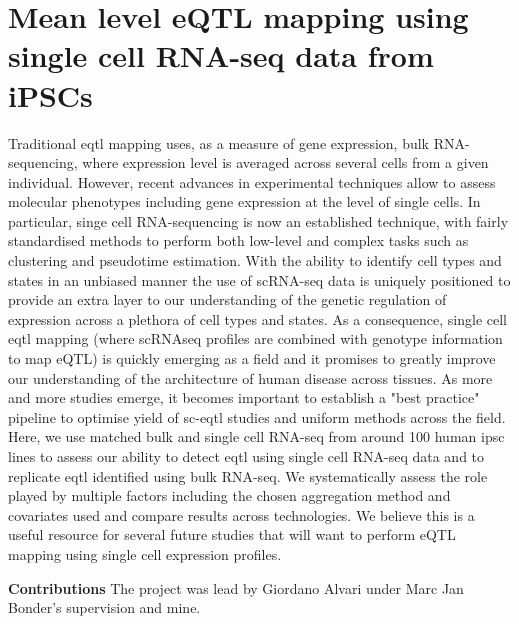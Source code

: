 
\chapter{Mean level eQTL mapping using single cell RNA-seq data from iPSCs}


Traditional \gls{eqtl} mapping uses, as a measure of gene expression, bulk RNA-sequencing, where expression level is averaged across several cells from a given individual.
However, recent advances in experimental techniques allow to assess molecular phenotypes including gene expression at the level of single cells.
In particular, singe cell RNA-sequencing is now an established technique, with fairly standardised methods to perform both low-level and complex tasks such as clustering and pseudotime estimation.
With the ability to identify cell types and states in an unbiased manner the use of scRNA-seq data is uniquely positioned to provide an extra layer to our understanding of the genetic regulation of expression across a plethora of cell types and states.
As a consequence, single cell \gls{eqtl} mapping (where scRNAseq profiles are combined with genotype information to map eQTL) is quickly emerging as a field and it promises to greatly improve our understanding of the architecture of human disease across tissues.
As more and more studies emerge, it becomes important to establish a "best practice" pipeline to optimise yield of sc-\gls{eqtl} studies and uniform methods across the field.
Here, we use matched bulk and single cell RNA-seq from around 100 human \gls{ipsc} lines to assess our ability to detect \gls{eqtl} using single cell RNA-seq data and to replicate \gls{eqtl} identified using bulk RNA-seq.
We systematically assess the role played by multiple factors including the chosen aggregation method and covariates used and compare results across technologies.
We believe this is a useful resource for several future studies that will want to perform eQTL mapping using single cell expression profiles.

\newpage

\begin{Comment2}
\hspace{-3mm}\textbf{Contributions} 
The project was lead by Giordano Alvari under Marc Jan Bonder's supervision and mine.
\end{Comment2}

